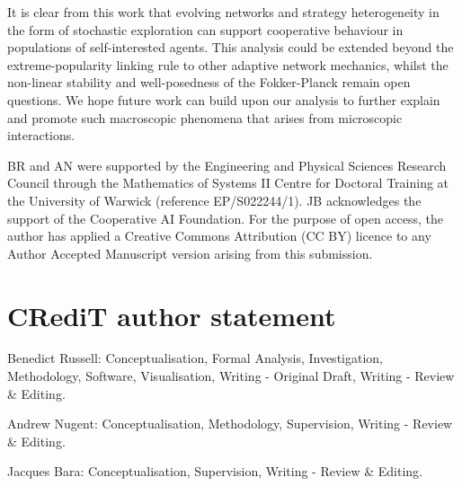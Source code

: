 \documentclass[10pt]{article}
\begin{document}
It is clear from this work that evolving networks and strategy heterogeneity in the form of stochastic exploration can support cooperative behaviour in populations of self-interested agents. This analysis could be extended beyond the extreme-popularity linking rule to other adaptive network mechanics, whilst the non-linear stability and well-posedness of the Fokker-Planck remain open questions. We hope future work can build upon our analysis to further explain and promote such macroscopic phenomena that arises from microscopic interactions.

\begin{acks}
BR and AN were supported by the Engineering and Physical Sciences Research Council through the Mathematics of Systems II Centre for Doctoral Training at the University of Warwick (reference EP/S022244/1). JB acknowledges the support of the Cooperative AI Foundation. For the purpose of open access, the author has applied a Creative Commons Attribution (CC BY) licence to any Author Accepted Manuscript version arising from this submission.
\end{acks}

\section*{CRediT author statement}
\noindent 

Benedict Russell: Conceptualisation, Formal Analysis, Investigation, Methodology, Software, Visualisation, Writing - Original Draft, Writing - Review \& Editing.

Andrew Nugent: Conceptualisation, Methodology, Supervision, Writing - Review \& Editing.

Jacques Bara: Conceptualisation, Supervision, Writing - Review \& Editing.

\printbibliography
\newpage
\appendix
\end{document}
